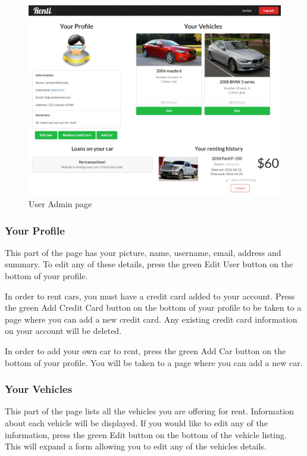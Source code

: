 \documentclass{article}
\begin{document}
\begin{figure}[ht!]
    \centering
    \includegraphics[keepaspectratio, width=\textwidth]{UserAdmin}
    \caption{User Admin page}
    \label{fig:UserAdmin}
\end{figure}

\subsubsection{Your Profile}
This part of the page has your picture, name, username, email, address and summary. To edit any of these details, press the green Edit User button on the bottom of your profile.

In order to rent cars, you must have a credit card added to your account. Press the green Add Credit Card button on the bottom of your profile to be taken to a page where you can add a new credit card. Any existing credit card information on your account will be deleted.

In order to add your own car to rent, press the green Add Car button on the bottom of your profile. You will be taken to a page where you can add a new car.

\subsubsection{Your Vehicles}
This part of the page lists all the vehicles you are offering for rent. Information about each vehicle will be displayed. If you would like to edit any of the information, press the green Edit button on the bottom of the vehicle listing. This will expand a form allowing you to edit any of the vehicles details.
\end{document}
